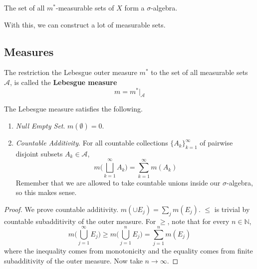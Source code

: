   \begin{corollary}
    The set of all $m^\ast$-measurable sets of $X$ form a $\sigma$-algebra. 
  \end{corollary}

  With this, we can construct a lot of measurable sets. 
  
\subsection{Measures} 

  \begin{definition}
    The restriction the Lebesgue outer measure $m^\ast$ to the set of all measurable sets $\mathcal{A}$, is called the \textbf{Lebesgue measure} 
    \begin{equation}
      m = m^\ast \big|_{\mathcal{A}}
    \end{equation}
  \end{definition}

  \begin{lemma}
    The Lebesgue measure satisfies the following. 
    \begin{enumerate}
      \item \textit{Null Empty Set}. $m(\emptyset) = 0$. 
      \item \textit{Countable Additivity}. For all countable collections $\{A_k\}_{k=1}^\infty$ of pairwise disjoint subsets $A_k \in \mathcal{A}$, 
      \begin{equation}
        m \bigg( \bigsqcup_{k=1}^\infty A_k \bigg) = \sum_{k=1}^\infty m(A_k)
      \end{equation}
      Remember that we are allowed to take countable unions inside our $\sigma$-algebra, so this makes sense. 
    \end{enumerate}
  \end{lemma}
  \begin{proof}
    We prove countable additivity. $m( \cup E_j) = \sum_j m(E_j)$. $\leq$ is trivial by countable subadditivity of the outer measure. For $\geq$, note that for every $n \in \mathbb{N}$, 
    \begin{equation}
      m \bigg( \bigcup_{j=1}^\infty E_j \bigg) \geq m \bigg( \bigcup_{j=1}^n E_j \bigg) = \sum_{j=1}^n m(E_j) 
    \end{equation}
    where the inequality comes from monotonicity and the equality comes from finite subadditivity of the outer measure. Now take $n \to \infty$. 
  \end{proof}

